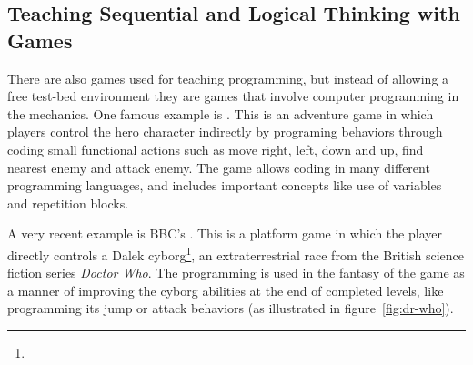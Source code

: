 \documentclass{sigchi}
\begin{document}
    \subsection{Teaching Sequential and Logical Thinking with Games}
        There are also games used for teaching programming, but instead of
        allowing a free test-bed environment they are games that involve
        computer programming in the mechanics. One famous example is \codecombat 
        \cite{Saines2013}. This is an adventure game in which players control
        the hero character indirectly by programing behaviors through coding
        small functional actions such as move right, left, down and up, find
        nearest enemy and attack enemy. The game allows coding in many different
        programming languages, and includes important concepts like use of
        variables and repetition blocks.

        A very recent example is BBC's \doctorgame \cite{BBC2014}. This is a
        platform game in which the player directly controls a Dalek
        cyborg\footnote{\doctorsite}, an extraterrestrial race from the British
        science fiction series \textit{Doctor Who}. The programming is used in
        the fantasy of the game as a manner of improving the cyborg abilities at
        the end of completed levels, like programming its jump or attack
        behaviors (as illustrated in figure~\ref{fig:dr-who}).
\end{document}
